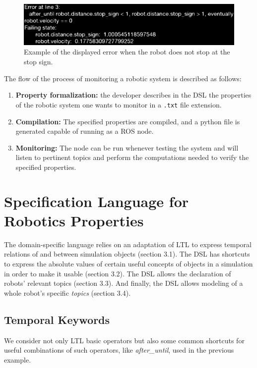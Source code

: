 \documentclass[runningheads]{llncs}
\begin{document}
\begin{figure}
\includegraphics[width=\textwidth]{error.eps}
\caption{Example of the displayed error when the robot does not stop at the stop sign.} \label{fig1}
\end{figure}

The flow of the process of monitoring a robotic system is described as follows:

\begin{enumerate}[label=(\roman*)]
    \item \textbf{Property formalization:} the developer describes in the DSL the properties of the robotic system one wants to monitor in a \texttt{.txt} file extension.
    \item \textbf{Compilation:} The specified properties are compiled, and a python file is generated capable of running as a ROS node.
    \item \textbf{Monitoring:} The node can be run whenever testing the system and will listen to pertinent topics and perform the computations needed to verify the specified properties.
\end{enumerate}


\section{Specification Language for Robotics Properties}

The domain-specific language relies on an adaptation of LTL to express temporal relations of and between simulation objects (section 3.1). The DSL has shortcuts to express the absolute values of certain useful concepts of objects in a simulation in order to make it usable (section 3.2). The DSL allows the declaration of robots' relevant topics (section 3.3). And finally, the DSL allows modeling of a whole robot's specific \textit{topics} (section 3.4).

\subsection{Temporal Keywords}

We consider not only LTL basic operators but also some common shortcuts for useful combinations of such operators, like \textit{after\_until}, used in the previous example.
\end{document}
